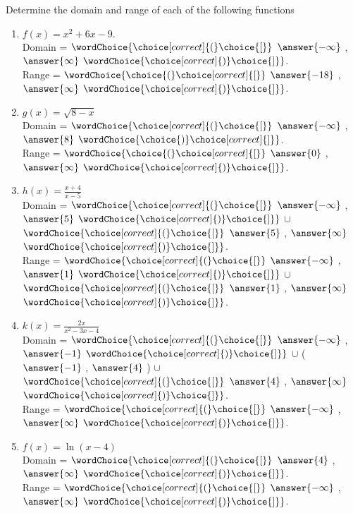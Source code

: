 \documentclass{ximera}
\author{Elizabeth Campolongo}
\begin{document}
\begin{exercise}
Determine the domain and range of each of the following functions
%
\begin{enumerate}

\item $f(x) = x^2+6x-9.$\\
Domain = $\wordChoice{\choice[correct]{(}\choice{[}}$ $\answer{-\infty}$ , $\answer{\infty}$ $\wordChoice{\choice[correct]{)}\choice{]}}$.\\
Range = $\wordChoice{\choice{(}\choice[correct]{[}}$ $\answer{-18}$ , $\answer{\infty}$ $\wordChoice{\choice[correct]{)}\choice{]}}$.


\item $g(x) = \sqrt{8-x} $\\
Domain = $\wordChoice{\choice[correct]{(}\choice{[}}$ $\answer{-\infty}$ , $\answer{8}$ $\wordChoice{\choice{)}\choice[correct]{]}}$.\\
Range = $\wordChoice{\choice{(}\choice[correct]{[}}$ $\answer{0}$ , $\answer{\infty}$ $\wordChoice{\choice[correct]{)}\choice{]}}$.


\item $h(x) =  \frac{x+4}{x-5}$\\
Domain = $\wordChoice{\choice[correct]{(}\choice{[}}$ 
$\answer{-\infty}$ , $\answer{5}$ 
$\wordChoice{\choice[correct]{)}\choice{]}}$ 
$\cup$  
$\wordChoice{\choice[correct]{(}\choice{[}}$ 
$\answer{5}$ , $\answer{\infty}$ 
$\wordChoice{\choice[correct]{)}\choice{]}}$.\\
Range = $\wordChoice{\choice[correct]{(}\choice{[}}$ 
$\answer{-\infty}$ , $\answer{1}$ 
$\wordChoice{\choice[correct]{)}\choice{]}}$ 
$\cup$  
$\wordChoice{\choice[correct]{(}\choice{[}}$ 
$\answer{1}$ , $\answer{\infty}$ 
$\wordChoice{\choice[correct]{)}\choice{]}}$.

\item $k(x)= \frac{2x}{x^2-3x-4}$\\
Domain = $\wordChoice{\choice[correct]{(}\choice{[}}$ 
$\answer{-\infty}$ , $\answer{-1}$ 
$\wordChoice{\choice[correct]{)}\choice{]}}$ 
$\cup$  
\Big( 
$\answer{-1}$ , $\answer{4}$ 
\Big)
$\cup$  
$\wordChoice{\choice[correct]{(}\choice{[}}$ 
$\answer{4}$ , $\answer{\infty}$ 
$\wordChoice{\choice[correct]{)}\choice{]}}$.\\
Range = $\wordChoice{\choice[correct]{(}\choice{[}}$ 
$\answer{-\infty}$ , $\answer{\infty}$ 
$\wordChoice{\choice[correct]{)}\choice{]}}$.


\item $f(x) = \ln(x-4)$ \\
Domain = $\wordChoice{\choice[correct]{(}\choice{[}}$ $\answer{4}$ , $\answer{\infty}$ $\wordChoice{\choice[correct]{)}\choice{]}}$.\\
Range = $\wordChoice{\choice[correct]{(}\choice{[}}$ $\answer{-\infty}$ , $\answer{\infty}$ $\wordChoice{\choice[correct]{)}\choice{]}}$.



\end{enumerate}
\end{exercise}
\end{document}
